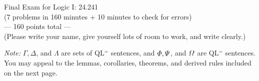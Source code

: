 \documentclass[12pt]{article}
\begin{document}
%
%
\newcommand{\detritus}[1]{}


\thispagestyle{empty}






\begin{center}
\large Final Exam for Logic I: 24.241 \\[1ex] 
\normalsize (7 problems in 160 minutes + 10 minutes to check for errors)\\
  \vspace{.1in}
\normalsize --- 160 points total ---\\
  \vspace{.25in}
\normalsize (Please write your name, give yourself lots of room to work, and write clearly.)
\end{center}

\noindent
\textit{Note:} $\Gamma,\Delta$, and $\Lambda$ are sets of QL$^=$ sentences, and $\varPhi,\varPsi$, and $\varOmega$ are QL$^=$ sentences. 
You may appeal to the lemmas, corollaries, theorems, and derived rules included on the next page.\\
\end{document}
